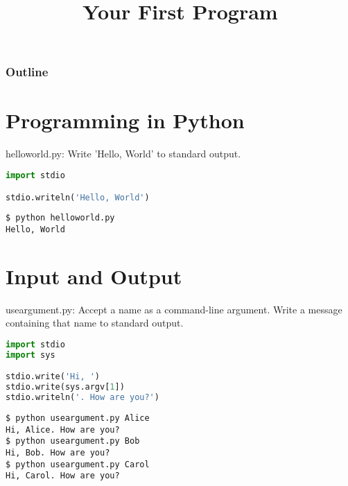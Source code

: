 \documentclass[8pt,a4paper,compress,handout]{beamer}
\title{Your First Program}
\date{}
\begin{document}
\begin{frame}
\vfill
\titlepage
\end{frame}

\begin{frame}
\frametitle{Outline}
\tableofcontents
\end{frame}

\section{Programming in Python}
\begin{frame}[fragile]
\begin{framed}
\tiny helloworld.py: Write 'Hello, World' to standard output.
\end{framed}

\begin{lstlisting}[language=Python]
import stdio

stdio.writeln('Hello, World')
\end{lstlisting}


\begin{lstlisting}[language={}]
$ python helloworld.py 
Hello, World
\end{lstlisting}
\end{frame}

\section{Input and Output}
\begin{frame}[fragile]
\begin{framed}
\tiny useargument.py: Accept a name as a command-line argument. Write a message containing that name to standard output.
\end{framed}

\begin{lstlisting}[language=Python]
import stdio
import sys

stdio.write('Hi, ')
stdio.write(sys.argv[1])
stdio.writeln('. How are you?')
\end{lstlisting}

\begin{lstlisting}[language={}]
$ python useargument.py Alice
Hi, Alice. How are you?
$ python useargument.py Bob
Hi, Bob. How are you?
$ python useargument.py Carol
Hi, Carol. How are you?
\end{lstlisting}
\end{frame}
\end{document}
